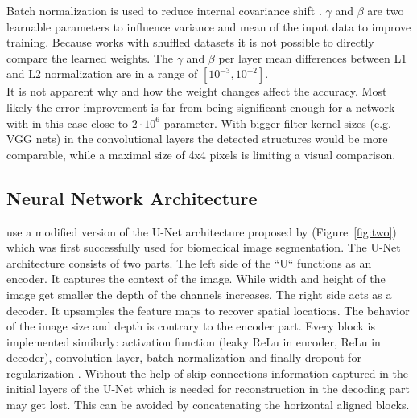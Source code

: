 \documentclass[acmtog]{techreportacmart}
\begin{document}
Batch normalization is used to reduce internal covariance shift \cite{ioffe2015}. 
$\gamma$ and $\beta$ are two learnable parameters to influence variance and mean of the 
input data to improve training. Because \cite{Thuerey20} works with shuffled datasets 
it is not possible to directly compare the learned weights. The $\gamma$ and $\beta$ 
per layer mean differences between L1 and L2 normalization are in a range of $[10^{-3}, 10^{-2}]$. \\ 
It is not apparent why and how the weight changes affect the accuracy. Most likely the error 
improvement is far from being significant enough for a network with in this case close to 
$2 \cdot 10^{6}$ parameter. With bigger filter kernel sizes (e.g. VGG nets) in the convolutional 
layers the detected structures would be more comparable, while a maximal size of 4x4 pixels is limiting a visual comparison.

\subsection{Neural Network Architecture}
\cite{Thuerey20} use a modified version of the U-Net architecture proposed by \cite{ronneberger2015} 
(Figure~\ref{fig:two}) which was first successfully used for biomedical image segmentation.
The U-Net architecture consists of two parts. The left side of the ``U`` functions as an encoder. 
It captures the context of the image. While width and height of the image get smaller the depth 
of the channels increases. The right side acts as a decoder. It upsamples the feature maps to 
recover spatial locations. The behavior of the image size and depth is contrary to the encoder 
part. Every block is implemented similarly: activation function (leaky ReLu in encoder, ReLu in 
decoder), convolution layer, batch normalization and finally dropout for regularization \cite{Thuerey20}. 
Without the help of skip connections information captured in the initial layers of the U-Net 
which is needed for reconstruction in the decoding part may get lost. 
This can be avoided by concatenating the horizontal aligned blocks.
\end{document}
